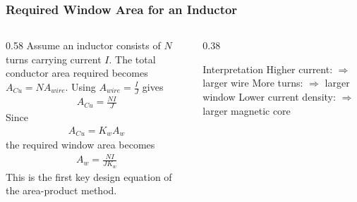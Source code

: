 \begin{frame} 
    \frametitle{Required Window Area for an Inductor} 
    \begin{columns} 
        \begin{column}{0.58\textwidth} 
            Assume an inductor consists of $N$ turns carrying current $I$. 
            \vspace{0.15cm} 
            The total conductor area required becomes 
                $A_{Cu} = N A_{wire}$.
            Using $A_{wire} = \frac{I}{J}$ gives
            \begin{align} 
                A_{Cu} = \frac{NI}{J} 
            \end{align} 
            Since 
            \begin{align} 
                A_{Cu} = K_w A_w 
            \end{align} 
            the required window area becomes 
            \begin{align} 
                A_w = \frac{NI}{J K_w} 
            \end{align} 
            This is the first key design equation of the area-product method. 
        \end{column} 
        \begin{column}{0.38\textwidth} 
            \begin{block}{Interpretation} Higher current: $\Rightarrow$ larger wire \vspace{0.1cm} More turns: $\Rightarrow$ larger window \vspace{0.1cm} Lower current density: $\Rightarrow$ larger magnetic core 
            \end{block} 
        \end{column} 
    \end{columns} 
\end{frame} 

